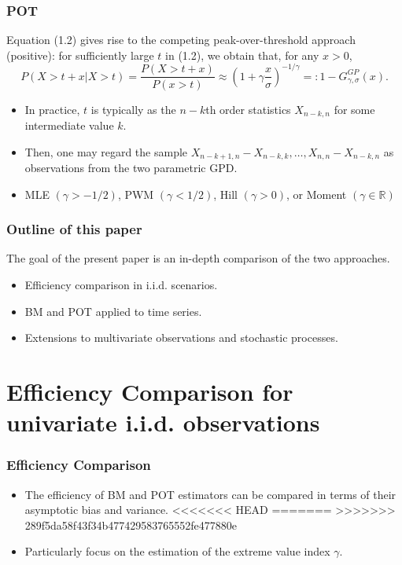 \documentclass{beamer}
\begin{document}
\begin{frame}
    \frametitle{POT}
Equation (1.2) gives rise to the competing peak-over-threshold approach (positive): for sufficiently large $t$ in (1.2), we obtain that, for any $x>0$,
$$
P(X>t+x|X>t) = \frac{P(X>t+x)}{P(x>t)}\approx (1+\gamma \frac{x}{\sigma})^{-1/\gamma}=:1-G_{\gamma,\sigma}^{GP}(x).
$$
\begin{itemize}
    \item In practice, $t$ is typically as the $n-k$th order statistics $X_{n-k,n}$ for some intermediate value $k$.
    \item Then, one may regard the sample $X_{n-k+1,n}-X_{n-k,k}, \dots, X_{n,n}-X_{n-k,n}$ as observations from the two parametric GPD.
    \item  MLE $(\gamma>-1/2)$, PWM $(\gamma<1/2)$, Hill $(\gamma>0)$, or Moment $(\gamma\in \mathbb{R})$
\end{itemize}

\end{frame}

\begin{frame}
    \frametitle{Outline of this paper}
    The goal of the present paper is an in-depth comparison of the two approaches.
\begin{itemize}
    \item Efficiency comparison in i.i.d. scenarios.
    \vspace{5ex}
    \item BM and POT applied to time series.
    \vspace{5ex}
    \item Extensions to multivariate observations and stochastic processes.
\end{itemize}
    

\end{frame}

\section{Efficiency Comparison for univariate i.i.d. observations}
\begin{frame}
    \frametitle{Efficiency Comparison}
\begin{itemize}
    \item The efficiency of BM and POT estimators can be compared in terms of their asymptotic bias and
    variance.
<<<<<<< HEAD
    \bigskip
=======
>>>>>>> 289f5da58f43f34b477429583765552fe477880e
    \item Particularly focus on the estimation of the extreme value index $\gamma$.
\end{itemize}
    

\end{frame}
\end{document}
